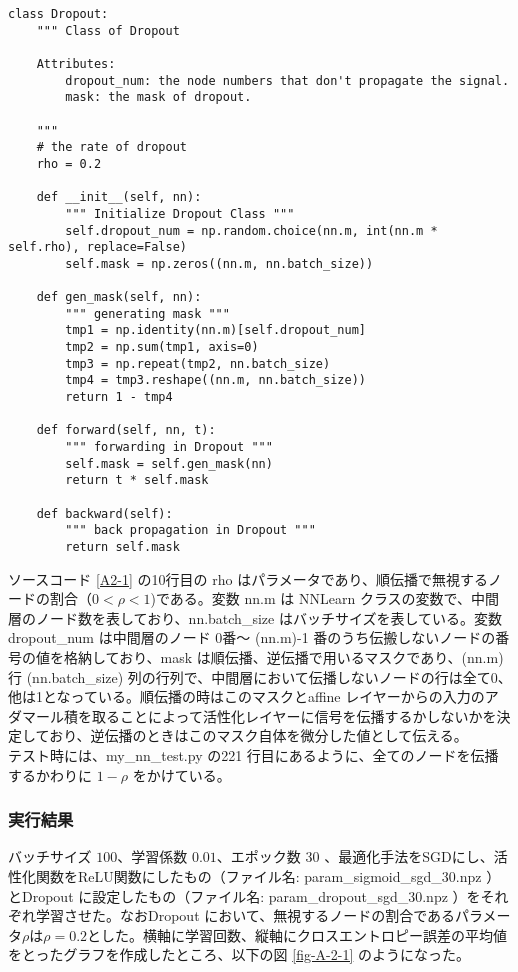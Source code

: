 \documentclass[a4paper,dvipdfmx]{jsarticle}
\begin{document}
\begin{lstlisting}[caption="クラス Dropout ",label=A2-1]
class Dropout:
    """ Class of Dropout

    Attributes:
        dropout_num: the node numbers that don't propagate the signal.
        mask: the mask of dropout.

    """
    # the rate of dropout
    rho = 0.2

    def __init__(self, nn):
        """ Initialize Dropout Class """
        self.dropout_num = np.random.choice(nn.m, int(nn.m * self.rho), replace=False)
        self.mask = np.zeros((nn.m, nn.batch_size))

    def gen_mask(self, nn):
        """ generating mask """
        tmp1 = np.identity(nn.m)[self.dropout_num]
        tmp2 = np.sum(tmp1, axis=0)
        tmp3 = np.repeat(tmp2, nn.batch_size)
        tmp4 = tmp3.reshape((nn.m, nn.batch_size))
        return 1 - tmp4

    def forward(self, nn, t):
        """ forwarding in Dropout """
        self.mask = self.gen_mask(nn)
        return t * self.mask

    def backward(self):
        """ back propagation in Dropout """
        return self.mask
\end{lstlisting}

ソースコード \ref{A2-1} の10行目の rho はパラメータであり、順伝播で無視するノードの割合（$ 0 < \rho < 1$)である。変数 nn.m は NNLearn クラスの変数で、中間層のノード数を表しており、nn.batch\_size はバッチサイズを表している。変数  dropout\_num は中間層のノード 0番〜 (nn.m)-1 番のうち伝搬しないノードの番号の値を格納しており、mask は順伝播、逆伝播で用いるマスクであり、(nn.m) 行 
 (nn.batch\_size) 列の行列で、中間層において伝播しないノードの行は全て0、他は1となっている。順伝播の時はこのマスクとaffine レイヤーからの入力のアダマール積を取ることによって活性化レイヤーに信号を伝播するかしないかを決定しており、逆伝播のときはこのマスク自体を微分した値として伝える。\\
 
 テスト時には、my\_nn\_test.py の221 行目にあるように、全てのノードを伝播するかわりに $1-\rho$ をかけている。
 
 \subsubsection*{実行結果}
 
バッチサイズ $100$、学習係数 $0.01$、エポック数 $30$ 、最適化手法をSGDにし、活性化関数をReLU関数にしたもの（ファイル名: param\_sigmoid\_sgd\_30.npz ）とDropout に設定したもの（ファイル名: param\_dropout\_sgd\_30.npz ）をそれぞれ学習させた。なおDropout において、無視するノードの割合であるパラメータ$\rho$は$\rho = 0.2$とした。横軸に学習回数、縦軸にクロスエントロピー誤差の平均値をとったグラフを作成したところ、以下の図 \ref{fig-A-2-1} のようになった。
\end{document}
